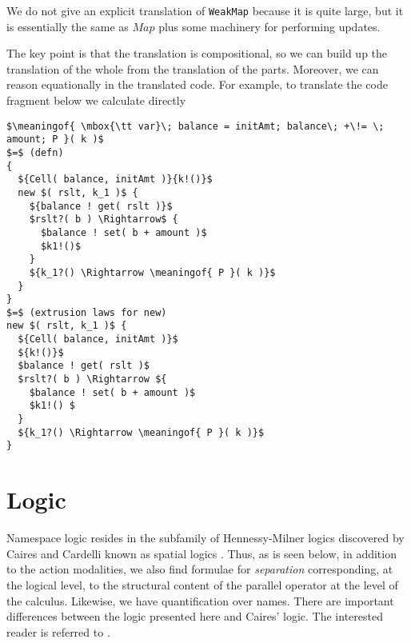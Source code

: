 \documentclass[]{acm_proc_article-sp}
\newcommand{\ldb}{[\![}
\newcommand{\rdb}{]\!]}
\newcommand{\meaningof}[1]{\ldb #1 \rdb}
\numberwithin{equation}{subsection}
\begin{document}
We do not give an explicit translation of {\tt WeakMap} because it is quite
large, but it is essentially the same as $Map$ plus some machinery for performing
updates.



The key point is that the translation is compositional, so we can
build up the translation of the whole from the translation of the
parts. Moreover, we can reason equationally in the translated
code. For example, to translate the code fragment below we calculate
directly


\begin{lstlisting}[mathescape]
$\meaningof{ \mbox{\tt var}\; balance = initAmt; balance\; +\!= \; amount; P }( k )$
$=$ (defn)
{ 
  ${Cell( balance, initAmt )}{k!()}$
  new $( rslt, k_1 )$ { 
    ${balance ! get( rslt )}$
    $rslt?( b ) \Rightarrow$ {
      $balance ! set( b + amount )$
      $k1!()$
    }
    ${k_1?() \Rightarrow \meaningof{ P }( k )}$
  }
}
$=$ (extrusion laws for new)
new $( rslt, k_1 )$ {
  ${Cell( balance, initAmt )}$
  ${k!()}$
  $balance ! get( rslt )$
  $rslt?( b ) \Rightarrow ${
    $balance ! set( b + amount )$
    $k1!() $
  }
  ${k_1?() \Rightarrow \meaningof{ P }( k )}$
}
\end{lstlisting}

\section{Logic}
Namespace logic resides in the subfamily of Hennessy-Milner logics
discovered by Caires and Cardelli known as spatial logics
\cite{DBLP:conf/fossacs/Caires04}. Thus, as is seen below, in addition
to the action modalities, we also find formulae for \emph{separation}
corresponding, at the logical level, to the structural content of the
parallel operator at the level of the calculus. Likewise, we have
quantification over names. There are important differences between the
logic presented here and Caires' logic. The interested reader is
referred to \cite{DBLP:conf/tgc/MeredithR05}.
\end{document}

